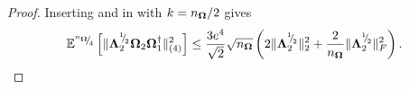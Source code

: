 \begin{proof}
    Inserting  and   in  with $k = n_{\boldsymbol{\Omega}} / 2$ gives
    \begin{equation}
        \mathbb{E}^{\sfrac{n_{\mtx{\Omega}}}{4}}\left[ \lVert \mtx{\Lambda}_2^{\sfrac{1}{2}} \mtx{\Omega}_2 \mtx{\Omega}_1^{\dagger} \rVert _{(4)}^2 \right]
        \leq \frac{3 e^4}{\sqrt{2}}  \sqrt{n_{\mtx{\Omega}}} \left( 2 \lVert \mtx{\Lambda}_2^{\sfrac{1}{2}} \rVert _2^2 + \frac{2}{n_{\mtx{\Omega}}} \lVert \mtx{\Lambda}_2^{\sfrac{1}{2}} \rVert _F^2 \right).

\end{equation}
\end{proof}
